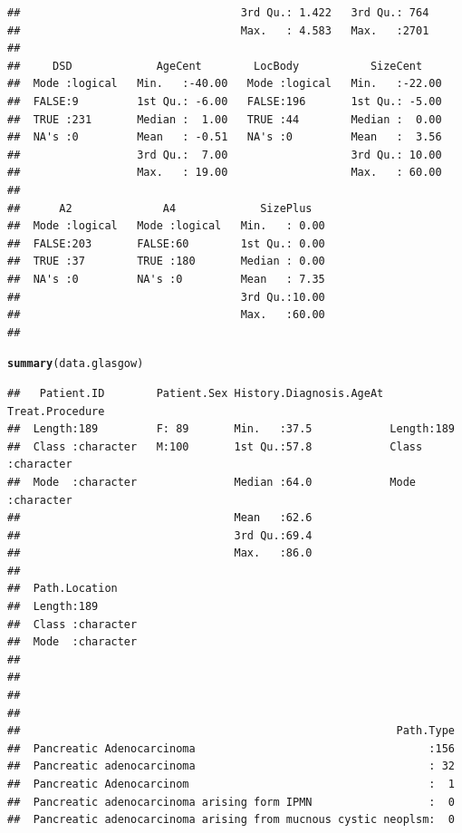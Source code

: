 \documentclass{article}\usepackage[]{graphicx}\usepackage[]{color}
\makeatletter
\newcommand{\hlstd}[1]{\textcolor[rgb]{0.345,0.345,0.345}{#1}}%
\newcommand{\hlkwd}[1]{\textcolor[rgb]{0.737,0.353,0.396}{\textbf{#1}}}%
\newenvironment{kframe}{%
 \def\at@end@of@kframe{}%
 \ifinner\ifhmode%
  \def\at@end@of@kframe{\end{minipage}}%
  \begin{minipage}{\columnwidth}%
 \fi\fi%
 \def\FrameCommand##1{\hskip\@totalleftmargin \hskip-\fboxsep
 \colorbox{shadecolor}{##1}\hskip-\fboxsep
     \hskip-\linewidth \hskip-\@totalleftmargin \hskip\columnwidth}%
 \MakeFramed {\advance\hsize-\width
   \@totalleftmargin\z@ \linewidth\hsize
   \@setminipage}}%
 {\par\unskip\endMakeFramed%
 \at@end@of@kframe}
\newenvironment{knitrout}{}{} %
\makeatother
\begin{document}
\begin{knitrout}
\begin{kframe}
\begin{verbatim}
##                                  3rd Qu.: 1.422   3rd Qu.: 764  
##                                  Max.   : 4.583   Max.   :2701  
##                                                                 
##     DSD             AgeCent        LocBody           SizeCent     
##  Mode :logical   Min.   :-40.00   Mode :logical   Min.   :-22.00  
##  FALSE:9         1st Qu.: -6.00   FALSE:196       1st Qu.: -5.00  
##  TRUE :231       Median :  1.00   TRUE :44        Median :  0.00  
##  NA's :0         Mean   : -0.51   NA's :0         Mean   :  3.56  
##                  3rd Qu.:  7.00                   3rd Qu.: 10.00  
##                  Max.   : 19.00                   Max.   : 60.00  
##                                                                   
##      A2              A4             SizePlus    
##  Mode :logical   Mode :logical   Min.   : 0.00  
##  FALSE:203       FALSE:60        1st Qu.: 0.00  
##  TRUE :37        TRUE :180       Median : 0.00  
##  NA's :0         NA's :0         Mean   : 7.35  
##                                  3rd Qu.:10.00  
##                                  Max.   :60.00  
## 
\end{verbatim}
\begin{alltt}
\hlkwd{summary}\hlstd{(data.glasgow)}
\end{alltt}
\begin{verbatim}
##   Patient.ID        Patient.Sex History.Diagnosis.AgeAt Treat.Procedure   
##  Length:189         F: 89       Min.   :37.5            Length:189        
##  Class :character   M:100       1st Qu.:57.8            Class :character  
##  Mode  :character               Median :64.0            Mode  :character  
##                                 Mean   :62.6                              
##                                 3rd Qu.:69.4                              
##                                 Max.   :86.0                              
##                                                                           
##  Path.Location     
##  Length:189        
##  Class :character  
##  Mode  :character  
##                    
##                    
##                    
##                    
##                                                          Path.Type  
##  Pancreatic Adenocarcinoma                                    :156  
##  Pancreatic adenocarcinoma                                    : 32  
##  Pancreatic Adenocarcinom                                     :  1  
##  Pancreatic adenocarcinoma arising form IPMN                  :  0  
##  Pancreatic adenocarcinoma arising from mucnous cystic neoplsm:  0  

\end{verbatim}
\end{kframe}
\end{knitrout}
\end{document}
